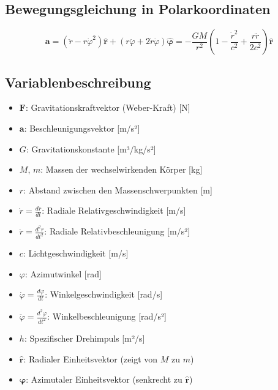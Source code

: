 \subsection{Bewegungsgleichung in Polarkoordinaten}
\begin{equation}\label{eq:weber_bewegungsgleichung}
\mathbf{a} = \left(\ddot{r} - r\dot{\varphi}^2\right)\mathbf{\hat{r}} + \left(r\ddot{\varphi} + 2\dot{r}\dot{\varphi}\right)\mathbf{\hat{\varphi}} = -\frac{GM}{r^2}\left(1 - \frac{\dot{r}^2}{c^2} + \frac{r\ddot{r}}{2c^2}\right)\mathbf{\hat{r}}
\end{equation}

\subsection*{Variablenbeschreibung}
\begin{itemize}[leftmargin=*,noitemsep]
    \item $\mathbf{F}$: Gravitationskraftvektor (Weber-Kraft) [N]
    \item $\mathbf{a}$: Beschleunigungsvektor [m/s²]
    \item $G$: Gravitationskonstante [m³/kg/s²]
    \item $M$, $m$: Massen der wechselwirkenden Körper [kg]
    \item $r$: Abstand zwischen den Massenschwerpunkten [m]
    \item $\dot{r} = \frac{dr}{dt}$: Radiale Relativgeschwindigkeit [m/s]
    \item $\ddot{r} = \frac{d^2r}{dt^2}$: Radiale Relativbeschleunigung [m/s²]
    \item $c$: Lichtgeschwindigkeit [m/s]
    \item $\varphi$: Azimutwinkel [rad]
    \item $\dot{\varphi} = \frac{d\varphi}{dt}$: Winkelgeschwindigkeit [rad/s]
    \item $\ddot{\varphi} = \frac{d^2\varphi}{dt^2}$: Winkelbeschleunigung [rad/s²]
    \item $h$: Spezifischer Drehimpuls [m²/s]
    \item $\mathbf{\hat{r}}$: Radialer Einheitsvektor (zeigt von $M$ zu $m$)
    \item $\mathbf{\hat{\varphi}}$: Azimutaler Einheitsvektor (senkrecht zu $\mathbf{\hat{r}}$)
\end{itemize}

